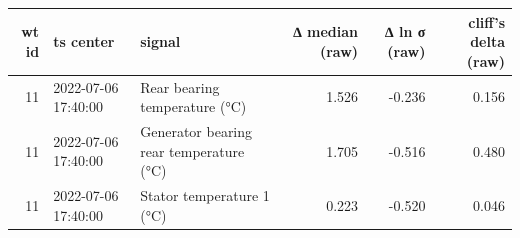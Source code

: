 \begin{tabular}{rllrrr}
\toprule
wt id & ts center & signal & ∆ median (raw) & ∆ ln σ  (raw) & cliff's delta (raw) \\
\midrule
11 & 2022-07-06 17:40:00 & Rear bearing temperature (°C) & 1.526 & -0.236 & 0.156 \\
11 & 2022-07-06 17:40:00 & Generator bearing rear temperature (°C) & 1.705 & -0.516 & 0.480 \\
11 & 2022-07-06 17:40:00 & Stator temperature 1 (°C) & 0.223 & -0.520 & 0.046 \\
\bottomrule
\end{tabular}

